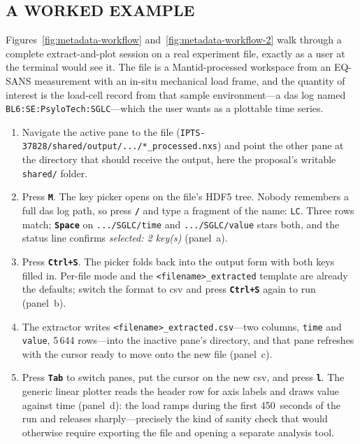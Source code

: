\documentclass[tm]{ornltm}
\newcommand{\key}[1]{\textbf{\texttt{#1}}}
\begin{document}
\subsection{A WORKED EXAMPLE}
\label{sec:metadata-example}

Figures~\ref{fig:metadata-workflow} and~\ref{fig:metadata-workflow-2} walk through a complete extract-and-plot
session on a real experiment file, exactly as a user at the terminal would see
it. The file is a Mantid-processed workspace from an EQ-SANS measurement with an
in-situ mechanical load frame, and the quantity of interest is the load-cell
record from that sample environment---a \ac{das} log named
\texttt{BL6:SE:PsyloTech:SGLC}---which the user wants as a plottable time
series.

\begin{enumerate}
  \item Navigate the active pane to the file
    (\texttt{IPTS-37828/shared/output/.../*\_processed.nxs}) and point the
    other pane at the directory that should receive the output, here the
    proposal's writable \texttt{shared/} folder.
  \item Press \key{M}. The key picker opens on the file's HDF5 tree. Nobody
    remembers a full \ac{das} log path, so press \key{/} and type a fragment
    of the name: \texttt{LC}. Three rows match; \key{Space} on
    \texttt{.../SGLC/time} and \texttt{.../SGLC/value} stars both, and the
    status line confirms \emph{selected: 2 key(s)}
    (panel~a).
  \item Press \key{Ctrl+S}. The picker folds back into the output form with
    both keys filled in. Per-file mode and the
    \texttt{<filename>\_extracted} template are already the defaults; switch
    the format to \ac{csv} and press \key{Ctrl+S} again to run
    (panel~b).
  \item The extractor writes
    \texttt{<filename>\_extracted.csv}---two columns, \texttt{time} and
    \texttt{value}, 5\,644 rows---into the inactive pane's directory, and
    that pane refreshes with the cursor ready to move onto the new file
    (panel~c).
  \item Press \key{Tab} to switch panes, put the cursor on the new \ac{csv},
    and press \key{l}. The generic linear plotter reads the header row for
    axis labels and draws value against time (panel~d): the load ramps
    during the first 450~seconds of the run and releases sharply---precisely
    the kind of sanity check that would otherwise require exporting the file
    and opening a separate analysis tool.
\end{enumerate}
\end{document}
